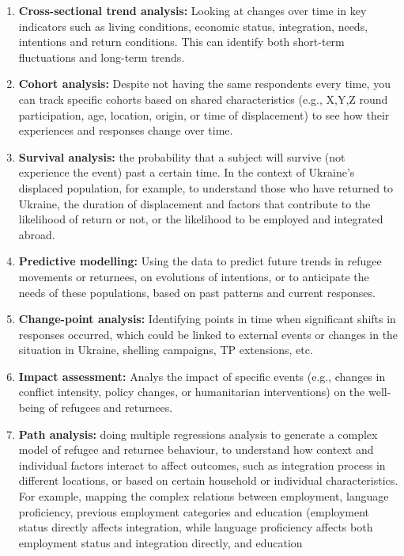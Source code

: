 \documentclass[
  letterpaper,
  DIV=11,
  numbers=noendperiod]{scrreprt}
\begin{document}
\begin{enumerate}
\def\labelenumi{\arabic{enumi}.}
\item
  \textbf{Cross-sectional trend analysis:} Looking at changes over time
  in key indicators such as living conditions, economic status,
  integration, needs, intentions and return conditions. This can
  identify both short-term fluctuations and long-term trends.
\item
  \textbf{Cohort analysis:} Despite not having the same respondents
  every time, you can track specific cohorts based on shared
  characteristics (e.g., X,Y,Z round participation, age, location,
  origin, or time of displacement) to see how their experiences and
  responses change over time.
\item
  \textbf{Survival analysis:} the probability that a subject will
  survive (not experience the event) past a certain time. In the context
  of Ukraine's displaced population, for example, to understand those
  who have returned to Ukraine, the duration of displacement and factors
  that contribute to the likelihood of return or not, or the likelihood
  to be employed and integrated abroad.
\item
  \textbf{Predictive modelling:} Using the data to predict future trends
  in refugee movements or returnees, on evolutions of intentions, or to
  anticipate the needs of these populations, based on past patterns and
  current responses.
\item
  \textbf{Change-point analysis:} Identifying points in time when
  significant shifts in responses occurred, which could be linked to
  external events or changes in the situation in Ukraine, shelling
  campaigns, TP extensions, etc.
\item
  \textbf{Impact assessment:} Analys the impact of specific events
  (e.g., changes in conflict intensity, policy changes, or humanitarian
  interventions) on the well-being of refugees and returnees.
\item
  \textbf{Path analysis:} doing multiple regressions analysis to
  generate a complex model of refugee and returnee behaviour, to
  understand how context and individual factors interact to affect
  outcomes, such as integration process in different locations, or based
  on certain household or individual characteristics. For example,
  mapping the complex relations between employment, language
  proficiency, previous employment categories and education (employment
  status directly affects integration, while language proficiency
  affects both employment status and integration directly, and education

\end{enumerate}
\end{document}

